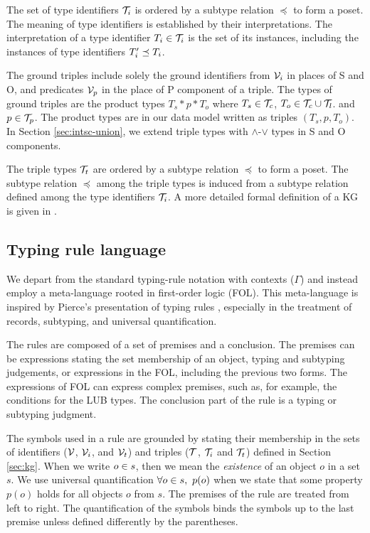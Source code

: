 \documentclass[runningheads]{llncs}
\newcommand{\V}{{\cal V}}
\newcommand{\T}{{\cal T}}
\begin{document}
The set of type identifiers $\T_i$ is ordered by a subtype relation
$\preceq$ to form a poset. The meaning of type identifiers is
established by their interpretations. The interpretation of a type
identifier $T_i\in\T_i$ is the set of its instances, including the
instances of type identifiers $T_i'\preceq\/T_i$.

The ground triples include solely the ground identifiers from $\V_i$
in places of S and O, and predicates $\V_p$ in the place of P
component of a triple. The types of ground triples are the product
types $T_s*p*T_o$ where $T_s\in\T_c$, $T_o\in\T_c\cup\T_l$. and
$p\in\T_p$. The product types are in our data model written as triples
$(T_s,p,T_o)$. In Section \ref{sec:intsc-union}, we extend triple types
with $\land$-$\lor$ types in S and O components.

The triple types $\T_t$ are ordered by a subtype relation $\preceq$ to
form a poset. The subtype relation $\preceq$ among the triple types is
induced from a subtype relation defined among the type identifiers
$\T_i$. A more detailed formal definition of a KG is given in
\cite{Savnik2025}.




\subsection{Typing rule language}

We depart from the standard typing-rule notation with contexts
($\Gamma$) \cite{Pierce2002,Hindley1997} and instead employ a
meta-language rooted in first-order logic (FOL). This meta-language is
inspired by Pierce’s presentation of typing rules \cite{Pierce2002},
especially in the treatment of records, subtyping, and universal
quantification.

The rules are composed of a set of premises and a conclusion. The
premises can be expressions stating the set membership of an object,
typing and subtyping judgements, or expressions in the FOL, including
the previous two forms. The expressions of FOL can express complex
premises, such as, for example, the conditions for the LUB types. The
conclusion part of the rule is a typing or subtyping judgment.

The symbols used in a rule are grounded by stating their membership in
the sets of identifiers ($\V$, $\V_i$, and $\V_t$) and triples ($\T$,
$\T_i$ and $\T_t$) defined in Section \ref{sec:kg}. When we write
$o\in\/s$, then we mean the \emph{existence} of an object $o$ in a set
$s$. We use universal quantification $\forall\/o\in\/s,\ p(o)$ when we
state that some property $p(o)$ holds for all objects $o$ from
$s$. The premises of the rule are treated from left to right. The
quantification of the symbols binds the symbols up to the last premise
unless defined differently by the parentheses.
\end{document}
